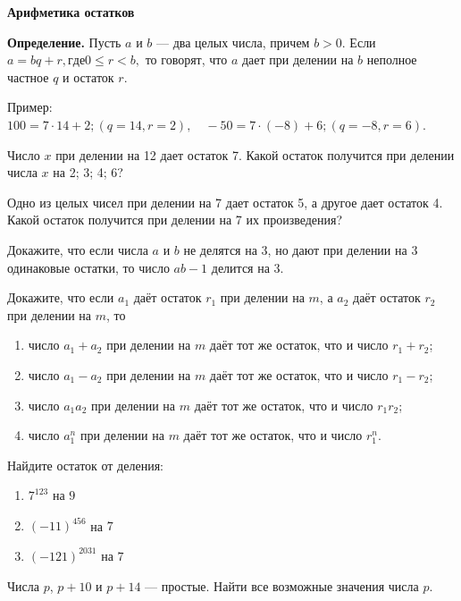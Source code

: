 \centerline{\bf \Huge Арифметика остатков}
\centerline{\bf \Huge }

\textbf{Определение.} Пусть $a$ и $b$ --- два целых числа, причем $b > 0$. Если $a = bq + r, где 0 \leq  r < b,$ то говорят, что $a$ дает при делении на $b$ неполное частное $q$ и остаток $r$.

Пример: $100 = 7 \cdot 14 + 2; (q = 14, r = 2) , \quad
- 50 = 7 \cdot (-8) + 6; (q = -8, r = 6).$

\begin{flushright}
        \scriptsize{}
\end{flushright}

Число $x$ при делении на 12 дает остаток 7. Какой остаток получится при делении числа $x$ на 2; 3; 4; 6?

Одно из целых чисел при делении на 7 дает остаток 5, а другое дает остаток 4. Какой остаток получится при делении на 7 их произведения?

Докажите, что если числа $a$ и $b$ не делятся на $3$, но дают при делении на $3$ одинаковые остатки, то число $ab - 1$ делится на $3$.

Докажите, что если \(a_1\) даёт остаток \(r_1\) при делении на \(m\), а \(a_2\) даёт остаток \(r_2\) при делении на \(m\), то
\begin{enumerate}
    \item[a)] число \(a_1 + a_2\) при делении на \(m\) даёт тот же остаток, что и число \(r_1 + r_2\);
    \item[б)] число \(a_1 - a_2\) при делении на \(m\) даёт тот же остаток, что и число \(r_1 - r_2\);
    \item[в)] число \(a_1 a_2\) при делении на \(m\) даёт тот же остаток, что и число \(r_1 r_2\);
    \item[г)] число \(a_1^n\) при делении на \(m\) даёт тот же остаток, что и число \(r_1^n\).
\end{enumerate}

Найдите остаток от деления:

\begin{enumerate}
    \item[a)] $7^{123}$ на $9$
    \item[б)] $(-11)^{456}$ на $7$
    \item[в)] $(-121)^{2031}$ на $7$
\end{enumerate}

Числа $p$, $p + 10$ и $p + 14$ --- простые. Найти все возможные значения числа $p$.